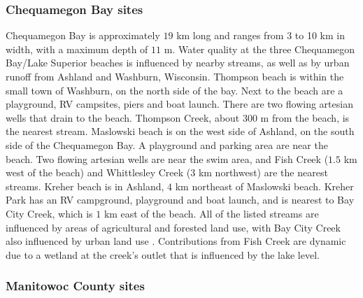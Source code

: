 \documentclass[authoryear,review, 12pt]{elsarticle}
\begin{document}
\subsubsection{Chequamegon Bay sites}\label{chequamegon-bay-sites}

Chequamegon Bay is approximately \(19\) km long and ranges from 3 to 10
km in width, with a maximum depth of \(11\) m. Water quality at the
three Chequamegon Bay/Lake Superior beaches is influenced by nearby
streams, as well as by urban runoff from Ashland and Washburn,
Wisconsin. Thompson beach is within the small town of Washburn, on the
north side of the bay. Next to the beach are a playground, RV campsites,
piers and boat launch. There are two flowing artesian wells that drain
to the beach. Thompson Creek, about \(300\) m from the beach, is the
nearest stream. Maslowski beach is on the west side of Ashland, on the
south side of the Chequamegon Bay. A playground and parking area are
near the beach. Two flowing artesian wells are near the swim area, and
Fish Creek (\(1.5\) km west of the beach) and Whittlesley Creek (\(3\)
km northwest) are the nearest streams. Kreher beach is in Ashland, \(4\)
km northeast of Maslowski beach. Kreher Park has an RV campground,
playground and boat launch, and is nearest to Bay City Creek, which is
\(1\) km east of the beach. All of the listed streams are influenced by
areas of agricultural and forested land use, with Bay City Creek also
influenced by urban land use \citep{Francy-et-al-2013}. Contributions
from Fish Creek are dynamic due to a wetland at the creek's outlet that
is influenced by the lake level.

\subsubsection{Manitowoc County sites}\label{manitowoc-county-sites}
\end{document}
